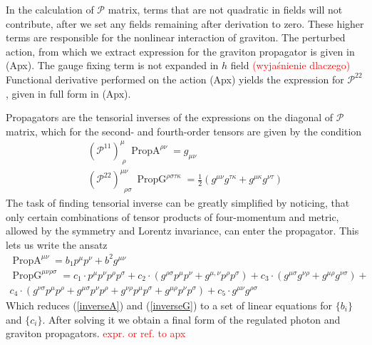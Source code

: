 \documentclass[11pt, a4paper]{article}
\begin{document}
In the calculation of $\mathcal{P}$ matrix, terms that are not quadratic in fields will not contribute, after we set any fields remaining after derivation to zero.
These higher terms are responsible for the nonlinear interaction of graviton. The perturbed action, from which we extract expression
for the graviton propagator is given in (Apx). The gauge fixing term is not expanded in $h$ field \textcolor{red}{(wyjaśnienie dlaczego)}
Functional derivative performed on the action (Apx) yields the expression for
$\mathcal{P}^{2 2}$, given in full form in (Apx).

Propagators are the tensorial inverses of the expressions on the diagonal of $\mathcal{P}$ matrix, which for
the second- and fourth-order tensors are given by the condition
\begin{gather}
    \left(\mathcal{P}^{1 1}\right)^{\mu}_{ \; \rho} \ \operatorname{PropA}^{\rho \nu}  = g_{\mu \nu} \label{inverseA}\\
    \left(\mathcal{P}^{2 2}\right)^{\mu\nu}_{ \; \; \rho \sigma} \ \operatorname{PropG}^{\rho \sigma \tau \kappa} = \frac{1}{2} \left( g^{\mu\nu} g^{\tau\kappa} + g^{\mu\kappa} g^{\nu\tau} \right) \label{inverseG}
\end{gather}
The task of finding tensorial inverse can be greatly simplified by noticing, that only certain combinations of tensor
products of four-momentum and metric, allowed by the symmetry and Lorentz invariance, can enter the propagator.
This lets us write the ansatz
\begin{gather}
    \operatorname{PropA}^{\mu \nu} = b_1 p^{\mu} p^{\nu} + b^2 g^{\mu\nu}\\
    \operatorname{PropG}^{\mu \nu \rho \sigma} =
    c_1 \cdot p^{\mu} p^{\nu}
   p^{\rho} p^{\sigma} + c_2 \cdot
   (g^{\rho \sigma} p^{\mu}
   p^{\nu} + g^{\mu,\nu}
   p^{\rho} p^{\sigma})+c_3 \cdot
   (g^{\mu \sigma} g^{\nu\rho} + g^{\mu \rho}
   g^{\nu\sigma})+ \\ c_4 \cdot (g^{\nu\sigma}
   p^{\mu}
   p^{\rho}+g^{\mu\sigma}
   p^{\nu}
   p^{\rho} +g^{\nu\rho}
   p^{\mu}
   p^{\sigma}+g^{\mu\rho}
   p^{\nu} p^{\sigma})+c_5 \cdot
   g^{\mu \nu} g^{\rho\sigma}
\end{gather}
Which reduces (\ref*{inverseA}) and (\ref*{inverseG}) to a set of linear equations for $\{b_i\}$ and $\{c_i\}$.
After solving it we obtain a final form of the regulated photon and graviton propagators. \textcolor{red}{expr. or ref. to apx}
\end{document}
